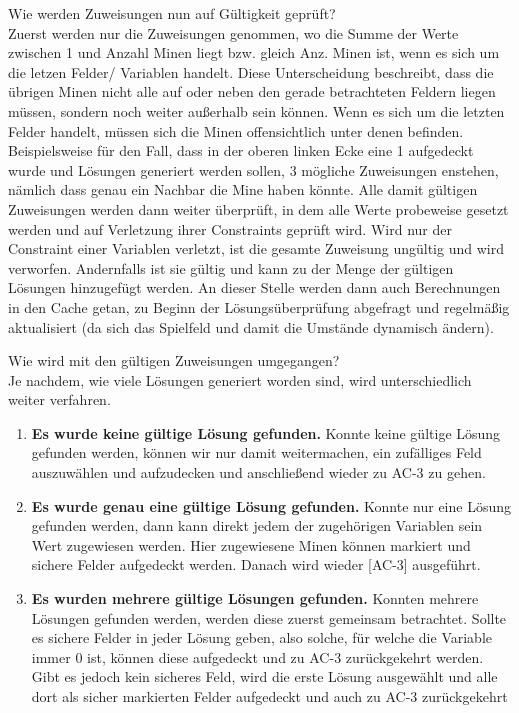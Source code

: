 Wie werden Zuweisungen nun auf Gültigkeit geprüft?\\
Zuerst werden nur die Zuweisungen genommen, wo die Summe der Werte zwischen 1 und Anzahl Minen liegt bzw. gleich Anz. Minen ist, wenn es
sich um die letzen Felder/ Variablen handelt. Diese Unterscheidung beschreibt, dass die übrigen Minen nicht alle auf oder neben den gerade
betrachteten Feldern liegen müssen, sondern noch weiter außerhalb sein können. Wenn es sich um die letzten Felder handelt, müssen sich die
Minen offensichtlich unter denen befinden. Beispielsweise für den Fall, dass in der oberen linken Ecke eine 1 aufgedeckt wurde und Lösungen
generiert werden sollen, 3 mögliche Zuweisungen enstehen, nämlich dass genau ein Nachbar die Mine haben könnte.
Alle damit gültigen Zuweisungen werden dann weiter überprüft, in dem alle Werte probeweise gesetzt werden und auf Verletzung ihrer Constraints
geprüft wird. Wird nur der Constraint einer Variablen verletzt, ist die gesamte Zuweisung ungültig und wird verworfen. Andernfalls ist sie
gültig und kann zu der Menge der gültigen Lösungen hinzugefügt werden. An dieser Stelle werden dann auch Berechnungen in den Cache getan, 
zu Beginn der Lösungsüberprüfung abgefragt und regelmäßig aktualisiert (da sich das Spielfeld und damit die Umstände dynamisch ändern).

Wie wird mit den gültigen Zuweisungen umgegangen?\\
Je nachdem, wie viele Lösungen generiert worden sind, wird unterschiedlich weiter verfahren.
\begin{enumerate}
    \item \textbf{Es wurde keine gültige Lösung gefunden.} Konnte keine gültige Lösung gefunden werden, können wir nur damit weitermachen,
    ein zufälliges Feld auszuwählen und aufzudecken und anschließend wieder zu AC-3 zu gehen.
    \item \textbf{Es wurde genau eine gültige Lösung gefunden.} Konnte nur eine Lösung gefunden werden, dann kann direkt jedem der zugehörigen
    Variablen sein Wert zugewiesen werden. Hier zugewiesene Minen können markiert und sichere Felder aufgedeckt werden. Danach wird wieder
    [AC-3] ausgeführt. 
    \item \textbf{Es wurden mehrere gültige Lösungen gefunden.} Konnten mehrere Lösungen gefunden werden, werden diese zuerst gemeinsam betrachtet.
    Sollte es sichere Felder in jeder Lösung geben, also solche, für welche die Variable immer 0 ist, können diese aufgedeckt und zu AC-3
    zurückgekehrt werden. Gibt es jedoch kein sicheres Feld, wird die erste Lösung ausgewählt und alle dort als sicher markierten Felder
    aufgedeckt und auch zu AC-3 zurückgekehrt
\end{enumerate}
